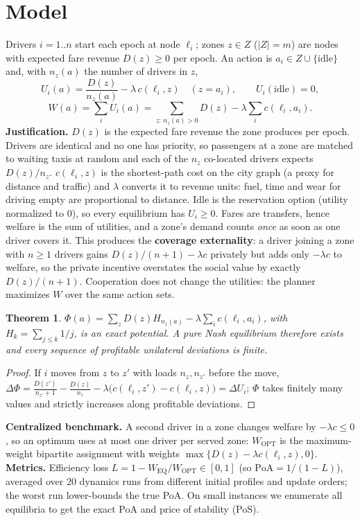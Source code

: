 \documentclass[11pt]{article}
\newtheorem{theorem}{Theorem}
\newcommand{\Wopt}{W_{\mathrm{OPT}}}\newcommand{\Weq}{W_{\mathrm{EQ}}}
\begin{document}
\section{Model}\label{sec:model}
Drivers $i=1..n$ start each epoch at node $\ell_i$; zones $z\in Z$ ($|Z|=m$) are nodes with expected fare revenue $D(z)\ge0$ per epoch. An action is $a_i\in Z\cup\{\mathrm{idle}\}$ and, with $n_z(a)$ the number of drivers in $z$,
\begin{equation}\label{eq:util}
U_i(a)=\frac{D(z)}{n_z(a)}-\lambda\,c(\ell_i,z)\quad (z=a_i),\qquad U_i(\mathrm{idle})=0,
\end{equation}
\begin{equation}\label{eq:welfare}
W(a)=\sum_iU_i(a)=\sum_{z:\,n_z(a)>0}D(z)-\lambda\sum_ic(\ell_i,a_i).
\end{equation}
\textbf{Justification.} $D(z)$ is the expected fare revenue the zone produces per epoch. Drivers are identical and no one has priority, so passengers at a zone are matched to waiting taxis at random and each of the $n_z$ co-located drivers expects $D(z)/n_z$. $c(\ell_i,z)$ is the shortest-path cost on the city graph (a proxy for distance and traffic) and $\lambda$ converts it to revenue units: fuel, time and wear for driving empty are proportional to distance. Idle is the reservation option (utility normalized to 0), so every equilibrium has $U_i\ge0$. Fares are transfers, hence welfare is the sum of utilities, and a zone's demand counts \emph{once} as soon as one driver covers it. This produces the \textbf{coverage externality}: a driver joining a zone with $n\ge1$ drivers gains $D(z)/(n+1)-\lambda c$ privately but adds only $-\lambda c$ to welfare, so the private incentive overstates the social value by exactly $D(z)/(n+1)$. Cooperation does not change the utilities: the planner maximizes $W$ over the same action sets.
\begin{theorem}\label{thm:pot}
$\Phi(a)=\sum_zD(z)H_{n_z(a)}-\lambda\sum_ic(\ell_i,a_i)$, with $H_k=\sum_{j\le k}1/j$, is an exact potential. A pure Nash equilibrium therefore exists and every sequence of profitable unilateral deviations is finite.
\end{theorem}
\begin{proof} If $i$ moves from $z$ to $z'$ with loads $n_z,n_{z'}$ before the move, $\Delta\Phi=\frac{D(z')}{n_{z'}+1}-\frac{D(z)}{n_z}-\lambda\big(c(\ell_i,z')-c(\ell_i,z)\big)=\Delta U_i$; $\Phi$ takes finitely many values and strictly increases along profitable deviations.\end{proof}
\textbf{Centralized benchmark.} A second driver in a zone changes welfare by $-\lambda c\le0$, so an optimum uses at most one driver per served zone: $\Wopt$ is the maximum-weight bipartite assignment with weights $\max\{D(z)-\lambda c(\ell_i,z),0\}$.\\
\textbf{Metrics.} Efficiency loss $L=1-\Weq/\Wopt\in[0,1]$ (so $\mathrm{PoA}=1/(1-L)$), averaged over 20 dynamics runs from different initial profiles and update orders; the worst run lower-bounds the true PoA. On small instances we enumerate all equilibria to get the exact PoA and price of stability (PoS).
\end{document}
